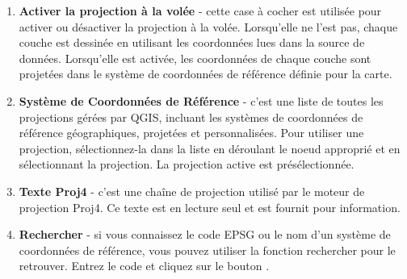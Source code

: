 \begin{enumerate}
\item \textbf{Activer la projection à la volée} -
cette case à cocher est utilisée pour activer ou désactiver la projection à la
volée. Lorsqu'elle ne l'est pas, chaque couche est dessinée en utilisant les
coordonnées lues dans la source de données. Lorsqu'elle est activée, les
coordonnées de chaque couche sont projetées dans le système de coordonnées de
référence définie pour la carte.
\item \textbf{Système de Coordonnées de Référence} - c'est une liste de toutes
les projections gérées par QGIS, incluant les systèmes de coordonnées
de référence géographiques, projetées et personnalisées. Pour utiliser une
projection, sélectionnez-la dans la liste en déroulant le noeud approprié et en
sélectionnant la projection. La projection active est présélectionnée.
\item \textbf{Texte Proj4} - c'est une chaîne de projection utilisé par le
moteur de projection Proj4. Ce texte est en lecture seul et est fournit pour
information.
\item \textbf{Rechercher} - si vous connaissez le code EPSG ou le nom d'un
système de coordonnées de référence, vous pouvez utiliser la fonction
rechercher pour le retrouver. Entrez le code et cliquez sur le bouton
.
\end{enumerate}

